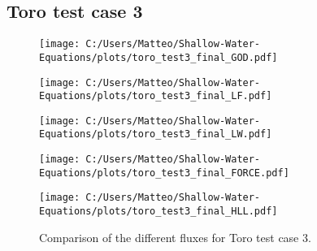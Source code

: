 \subsection{Toro test case 3}\label{app:toro_test_case_3}
\begin{figure}[H]
    \centering
    \begin{minipage}{0.45\textwidth}
        \centering
        \texttt{[image: C:/Users/Matteo/Shallow-Water-Equations/plots/toro\_test3\_final\_GOD.pdf]}
    \end{minipage}%
    \hfill
    \begin{minipage}{0.45\textwidth}
        \centering
        \texttt{[image: C:/Users/Matteo/Shallow-Water-Equations/plots/toro\_test3\_final\_LF.pdf]}
    \end{minipage}
    
    \vspace{0.5cm} %
    
    \begin{minipage}{0.45\textwidth}
        \centering
        \texttt{[image: C:/Users/Matteo/Shallow-Water-Equations/plots/toro\_test3\_final\_LW.pdf]}
    \end{minipage}%
    \hfill
    \begin{minipage}{0.45\textwidth}
        \centering
        \texttt{[image: C:/Users/Matteo/Shallow-Water-Equations/plots/toro\_test3\_final\_FORCE.pdf]}
    \end{minipage}

    \vspace{0.5cm} %
    
    \begin{minipage}{0.45\textwidth}
        \centering
        \texttt{[image: C:/Users/Matteo/Shallow-Water-Equations/plots/toro\_test3\_final\_HLL.pdf]}
    \end{minipage}
    \caption{Comparison of the different fluxes for Toro test case 3.}\label{fig:toro_test3_fluxes}
\end{figure}




